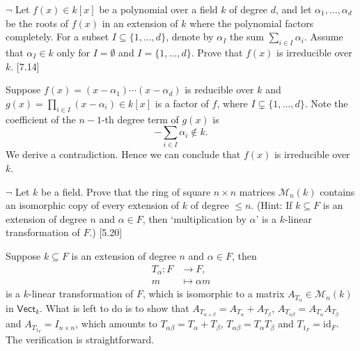 \documentclass[12pt,letterpaper,boxed]{hmcpset}
\begin{document}
\begin{problem}[1.8]
	$\neg$ Let $f(x) \in k[x]$ be a polynomial over a field $k$ of degree $d$, and let $\alpha_{1}, \ldots, \alpha_{d}$ be the roots of $f(x)$ in an extension of $k$ where the polynomial factors completely. For a subset $I \subseteq\{1, \ldots, d\}$, denote by $\alpha_{I}$ the sum $\sum_{i \in I} \alpha_{i}$. Assume that $\alpha_{I} \in k$ only for $I=\emptyset$ and $I=\{1, \ldots, d\}$. Prove that $f(x)$ is irreducible over $k$. [7.14]
\end{problem}
\begin{solution}
	Suppose $f(x)=(x-\alpha_1)\cdots(x-\alpha_d)$ is reducible over $k$ and $g(x)=\prod_{i\in I} (x-\alpha_{i})\in k[x]$ is a factor of $f$, where $I\subsetneq \{1, \ldots, d\}$. Note the coefficient of the $n-1$-th degree term of $g(x)$ is 
	\[
		-\sum_{i \in I} \alpha_{i}\notin k.
	\]
	We derive a contradiction. Hence we can conclude that $f(x)$ is irreducible over $k$.
\end{solution}

\begin{problem}[1.10]
	$\neg$ Let $k$ be a field. Prove that the ring of square $n \times n$ matrices $\mathcal{M}_{n}(k)$ contains an isomorphic copy of every extension of $k$ of degree $\leq n$. (Hint: If $k \subseteq F$ is an extension of degree $n$ and $\alpha \in F$, then `multiplication by $\alpha$' is a $k$-linear transformation of $F$.) [5.20]
\end{problem}
\begin{solution}
	Suppose $k\subseteq F$ is an extension of degree $n$ and $\alpha \in F$, then 
	\begin{align*}
		T_\alpha:F&\longrightarrow F,\\
		 m&\longmapsto\alpha m
	\end{align*} 
	is a $k$-linear transformation of $F$, which is isomorphic to a matrix $A_{T_\alpha}\in \mathcal{M}_{n}(k)$ in $\mathsf{Vect}_k$. What is left to do is to show that $A_{T_{\alpha+\beta}}=A_{T_{\alpha}}+A_{T_{\beta}}$, $A_{T_{\alpha\beta}}=A_{T_{\alpha}}A_{T_{\beta}}$ and $A_{T_{1_F}}=I_{n\times n}$, which amounts to $T_{\alpha\beta}=T_{\alpha}+T_{\beta}$, $T_{\alpha\beta}=T_{\alpha}T_{\beta}$ and $T_{1_F}=\mathrm{id}_F$. The verification is straightforward.
\end{solution}
\end{document}
